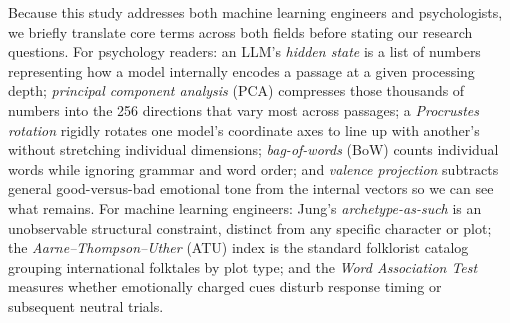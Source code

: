 \documentclass[conference]{IEEEtran}
\begin{document}
Because this study addresses both machine learning engineers and psychologists, we briefly translate core terms across both fields before stating our research questions. For psychology readers: an LLM's \textit{hidden state} is a list of numbers representing how a model internally encodes a passage at a given processing depth; \textit{principal component analysis} (PCA) compresses those thousands of numbers into the 256 directions that vary most across passages; a \textit{Procrustes rotation} rigidly rotates one model's coordinate axes to line up with another's without stretching individual dimensions; \textit{bag-of-words} (BoW) counts individual words while ignoring grammar and word order; and \textit{valence projection} subtracts general good-versus-bad emotional tone from the internal vectors so we can see what remains. For machine learning engineers: Jung's \textit{archetype-as-such} is an unobservable structural constraint, distinct from any specific character or plot; the \textit{Aarne--Thompson--Uther} (ATU) index \cite{uther2004types} is the standard folklorist catalog grouping international folktales by plot type; and the \textit{Word Association Test} measures whether emotionally charged cues disturb response timing or subsequent neutral trials.
\end{document}
